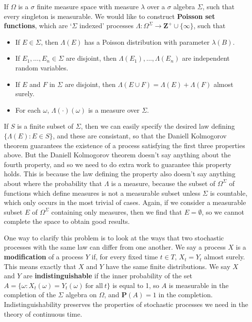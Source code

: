 \begin{example}
    If $\Omega$ is a $\sigma$ finite measure space with measure $\lambda$ over a $\sigma$ algebra $\Sigma$, such that every singleton is measurable. We would like to construct {\bf Poisson set functions}, which are `$\Sigma$ indexed' processes $\Lambda: \Omega^\Sigma \to \mathbf{Z}^+ \cup \{ \infty \}$, such that
    \begin{itemize}
        \item If $E \in \Sigma$, then $\Lambda(E)$ has a Poisson distribution with parameter $\lambda(B)$.
        \item If $E_1, \dots, E_n \in \Sigma$ are disjoint, then $\Lambda(E_1), \dots, \Lambda(E_n)$ are independent random variables.
        \item If $E$ and $F$ in $\Sigma$ are disjoint, then $\Lambda(E \cup F) = \Lambda(E) + \Lambda(F)$ almost surely.
        \item For each $\omega$, $\Lambda(\cdot)(\omega)$ is a measure over $\Sigma$.
    \end{itemize}
    If $S$ is a finite subset of $\Sigma$, then we can easily specify the desired law defining $\{ \Lambda(E): E \in S \}$, and these are consistant, so that the Daniell Kolmogorov theorem guarantees the existence of a process satisfying the first three properties above. But the Daniell Kolmogorov theorem doesn't say anything about the fourth property, and so we need to do extra work to guarantee this property holds. This is because the law defining the property also doesn't say anything about where the probability that $\Lambda$ is a measure, because the subset of $\Omega^\Sigma$ of functions which define measures is not a measurable subset unless $\Sigma$ is countable, which only occurs in the most trivial of cases. Again, if we consider a measurable subset $E$ of $\Omega^\Sigma$ containing only measures, then we find that $E = \emptyset$, so we cannot complete the space to obtain good results.
\end{example}

One way to clarify this problem is to look at the ways that two stochastic processes with the same law can differ from one another. We say a process $X$ is a {\bf modification} of a process $Y$ if, for every fixed time $t \in T$, $X_t = Y_t$ almost surely. This means exactly that $X$ and $Y$ have the same finite distributions. We say $X$ and $Y$ are {\bf indistinguishable} if the inner probability of the set $A = \{ \omega: X_t(\omega) = Y_t(\omega)\ \text{for all}\ t \}$ is equal to 1, so $A$ is measurable in the completion of the $\Sigma$ algebra on $\Omega$, and $\mathbf{P}(A) = 1$ in the completion. Indistinguishability preserves the properties of stochastic processes we need in the theory of continuous time.

